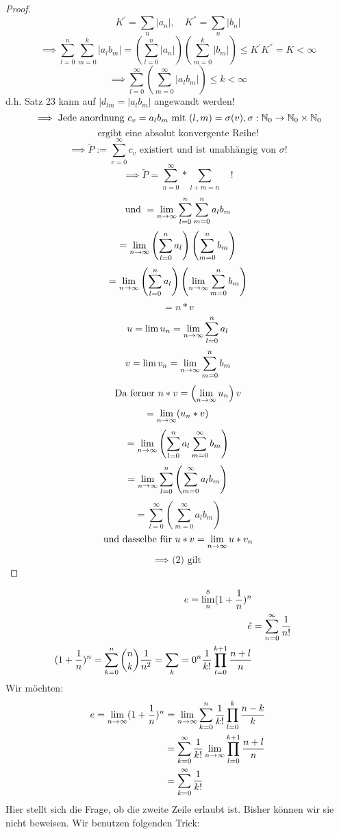 \begin{proof}
\[K^{'}=\sum_n |a_n|, \quad K^{''} = \sum_n |b_n|\]
\[\implies \sum_{l=0}^n \sum_{m=0}^k |a_l b_m| = \left( \sum_{l=0}^n |a_n| \right)\left( \sum_{m=0}^k |b_m| \right) \leq K^{'}K^{''} = K < \infty \]
\[\implies \sum_{l=0}^\infty \left( \sum_{m=0}^\infty |a_lb_m| \right) \leq k < \infty\]
d.h. Satz 23 kann auf $|d_{lm}=|a_lb_m|$ angewandt werden!
\[\implies \text{Jede anordnung } c_v = a_lb_m \text{ mit } (l,m) = \sigma(v), \sigma : \mathbb{N}_0 \to \mathbb{N}_0 \times \mathbb{N}_0 \]
\[\text{ergibt eine absolut konvergente Reihe!}\]
\[\implies \tilde{P} := \sum_{v=0}^\infty c_v \text{ existiert und ist unabhängig von } \sigma !\]
\[\implies \boxed{\tilde{P} = \sum_{n=0}^\infty * \sum_{l+m=n}} \quad !\]
\[\text{und } = \lim_{n \to \infty} \sum_{l=0}^n \sum_{m=0}^n a_l b_m\]
\[= \lim_{n \to \infty} \left( \sum_{l=0}^n a_l \right) \left( \sum_{m=0}^n b_m \right)\]
\[= \lim_{n \to \infty} \left( \sum_{l=0}^n a_l \right) \left( \lim_{n \to \infty} \sum_{m=0}^n b_m \right) \]
\[=n*v\]
\[u = \lim u_n = \lim_{n \to \infty} \sum_{l=0}^n a_l\]
\[v = \lim v_n = \lim_{n \to \infty} \sum_{m=0}^n b_m\]
\[\text{Da ferner } n*v = \left( \lim_{n \to \infty} u_n \right)v\]
\[ = \lim_{n \to \infty} (u_n*v)\]
\[ = \lim_{n \to \infty} \left( \sum_{l=0}^n a_l \sum_{m=0}^\infty b_m \right) \]
\[ = \lim_{n \to \infty} \sum_{l=0}^n \left( \sum_{m=0}^\infty a_lb_m \right) \]
\[ = \sum_{l=0}^\infty \left( \sum_{m=0}^\infty a_l b_m \right) \]
\[\text{und dasselbe für } u*v = \lim_{n \to \infty} u*v_n\]
\[\implies \text{ (2) gilt}\]

\end{proof}



\begin{equation}
 \begin{align}
  e = \lim_n^8 (1+\frac{1}{n})^n \\
  \tilde{e} &= \sum_{n=0}^{\infty} \frac{1}{n!} \\
  (1+\frac{1}{n})^n = \sum_{k=0}^n \binom {n} {k} \frac{1}{n^2} = \sum_k=0^n \frac{1}{k!} \prod_{l=0}^{k+1} \frac{n+l}{n}
 \end{align}  
\end{equation}
Wir möchten:
\begin{equation}
\begin{align}
 e = \lim_{n \to \infty} (1+\frac{1}{n})^n &= \lim_{n \to \infty} \sum_{k=0}^{n} \frac{1}{k!} \prod_{l=0}^{k} \frac{n-k}{k} \\
  &= \sum_{k=0}^\infty \frac{1}{k!} \lim_{n \to \infty} \prod_{l=0}^{k+1} \frac{n+l}{n} \\
  &= \sum_{k=0}^\infty \frac{1}{k!}
 \end{align}
\end{equation}
Hier stellt sich die Frage, ob die zweite Zeile erlaubt ist. Bisher können wir sie nicht beweisen.
Wir benutzen folgenden Trick:

